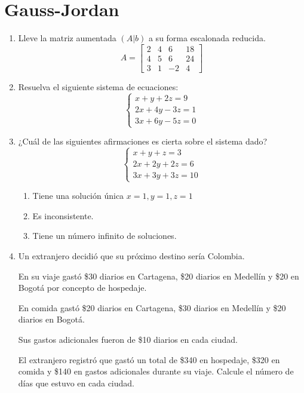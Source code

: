 \documentclass[12pt,letterpaper]{article}
\begin{document}
\section*{Gauss-Jordan}
\begin{enumerate}
    \item Lleve la matriz aumentada $(A|b)$ a su forma escalonada reducida.
    \renewcommand{\arraystretch}{1.2}
    \[A=
\left[
\begin{array}{ccc|c}
2 & 4 & 6 & 18 \\
4 & 5 & 6 & 24 \\
3 & 1 & -2 & 4
\end{array}
\right]
\]
    
    \item Resuelva el siguiente sistema de ecuaciones:
    \[
\begin{cases}
x + y + 2z = 9 \\
2x + 4y - 3z = 1 \\
3x + 6y - 5z = 0
\end{cases}
\]

    \item ¿Cuál de las siguientes afirmaciones es cierta sobre el sistema dado?
    \[
\begin{cases}
x + y + z = 3 \\
2x + 2y + 2z = 6 \\
3x + 3y + 3z = 10
\end{cases}
\]

    \begin{enumerate}
        \item Tiene una solución única $x=1, y=1, z=1$
        \item Es inconsistente.
        \item Tiene un número infinito de soluciones.
    \end{enumerate}

    \item Un extranjero decidió que su próximo destino sería Colombia. 

En su viaje gastó \$30 diarios en Cartagena, \$20 diarios en Medellín y \$20 en Bogotá por concepto de hospedaje. 

En comida gastó \$20 diarios en Cartagena, \$30 diarios en Medellín y \$20 diarios en Bogotá. 

Sus gastos adicionales fueron de \$10 diarios en cada ciudad. 

El extranjero registró que gastó un total de \$340 en hospedaje, \$320 en comida y \$140 en gastos adicionales durante su viaje. Calcule el número de días que estuvo en cada ciudad.
\end{enumerate}
\end{document}
